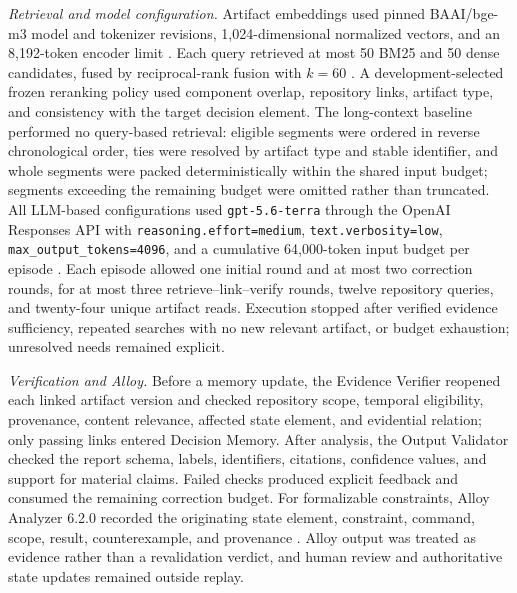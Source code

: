 \documentclass[10pt,conference]{IEEEtran}
\begin{document}
\noindent\textit{Retrieval and model configuration.} Artifact embeddings used pinned BAAI/bge-m3 model and tokenizer revisions, 1,024-dimensional normalized vectors, and an 8,192-token encoder limit \cite{Chen2024BgeM3}. Each query retrieved at most 50 BM25 and 50 dense candidates, fused by reciprocal-rank fusion with $k=60$ \cite{Cormack2009RRF,ElasticHybridSearch2026}. A development-selected frozen reranking policy used component overlap, repository links, artifact type, and consistency with the target decision element. The long-context baseline performed no query-based retrieval: eligible segments were ordered in reverse chronological order, ties were resolved by artifact type and stable identifier, and whole segments were packed deterministically within the shared input budget; segments exceeding the remaining budget were omitted rather than truncated. All LLM-based configurations used \texttt{gpt-5.6-terra} through the OpenAI Responses API with \texttt{reasoning.effort=medium}, \texttt{text.verbosity=low}, \texttt{max\_output\_tokens=4096}, and a cumulative 64,000-token input budget per episode \cite{OpenAIModels2026,OpenAIModelGuidance2026}. Each episode allowed one initial round and at most two correction rounds, for at most three retrieve--link--verify rounds, twelve repository queries, and twenty-four unique artifact reads. Execution stopped after verified evidence sufficiency, repeated searches with no new relevant artifact, or budget exhaustion; unresolved needs remained explicit.\par
\noindent\textit{Verification and Alloy.} Before a memory update, the Evidence Verifier reopened each linked artifact version and checked repository scope, temporal eligibility, provenance, content relevance, affected state element, and evidential relation; only passing links entered Decision Memory. After analysis, the Output Validator checked the report schema, labels, identifiers, citations, confidence values, and support for material claims. Failed checks produced explicit feedback and consumed the remaining correction budget. For formalizable constraints, Alloy Analyzer 6.2.0 recorded the originating state element, constraint, command, scope, result, counterexample, and provenance \cite{Jackson2012SoftwareAbstractions,AlloyTools2026}. Alloy output was treated as evidence rather than a revalidation verdict, and human review and authoritative state updates remained outside replay.\par
\end{document}
